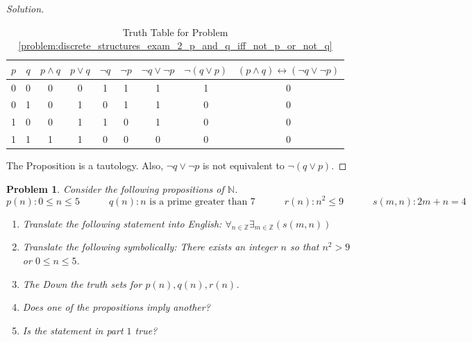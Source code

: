 \documentclass[oneside]{book}
\theoremstyle{mystyle}
\newtheorem{problem}{Problem}[section]
\begin{document}
\begin{proof}[Solution]
\begin{table}[H]
    \centering
    \begin{tabular}{c c c c c c c c c} 
         \hline
         $p$ & $q$ & $p\land q$ & $p \lor q$ & $\neg q$ & $\neg p$ & $\neg q\lor \neg p$ & $\neg(q\lor p)$ & $(p\land q)\leftrightarrow(\neg q \lor \neg p)$ \\ [0.5ex] 
         \hline
         0 & 0 & 0 & 0 & 1 & 1  &   1 & 1  & 0	\\ 
         0 & 1 & 0 & 1 & 0 & 1  &   1 & 0  & 0	\\
         1 & 0 & 0 & 1 & 1 & 0  &   1 & 0  & 0	\\
         1 & 1 & 1 & 1 & 0 & 0  &	0 & 0  & 0	\\
         \hline
    \end{tabular}
    \caption{Truth Table for Problem \ref{problem:discrete_structures_exam_2_p_and_q_iff_not_p_or_not_q}}
    \label{tab:discrete_structures_Exam_II_Problem_3}
\end{table}
The Proposition is a tautology. Also, $\neg q \lor \neg p$ is not equivalent to $\neg(q \lor p)$.
\end{proof}
\begin{problem}
Consider the following propositions of $\mathbb{N}$.
\begin{equation*}
    p(n): 0\leq n \leq 5 \quad\quad\quad q(n): n\textrm{ is a prime greater than 7} \quad\quad\quad r(n): n^2\leq 9 \quad\quad\quad s(m,n): 2m+n = 4
\end{equation*}
\begin{enumerate}
    \item Translate the following statement into English: $\forall_{n\in \mathbb{Z}}\exists_{m\in \mathbb{Z}}(s(m,n))$
    \item Translate the following symbolically: There exists an integer $n$ so that $n^2>9$ or $0\leq n \leq 5$.
    \item The Down the truth sets for $p(n),q(n),r(n)$.
    \item Does one of the propositions imply another?
    \item Is the statement in part $1$ true?
\end{enumerate}
\end{problem}
\end{document}
